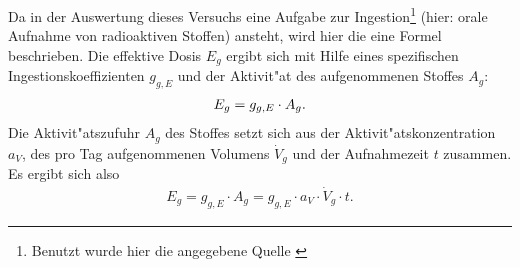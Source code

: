 \documentclass[12pt]{article}
\begin{document}
Da in der Auswertung dieses Versuchs eine Aufgabe zur Ingestion\footnote{Benutzt wurde hier die angegebene Quelle \cite{vogt-schulz}} (hier: orale Aufnahme von radioaktiven Stoffen) ansteht, wird hier die eine Formel beschrieben. Die effektive Dosis $E_g$ ergibt sich mit Hilfe eines spezifischen Ingestionskoeffizienten $g_{g,E}$ und der Aktivit"at des aufgenommenen Stoffes $A_g$:
\begin{align}
E_g=g_{g,E}\cdot A_g. \notag
\end{align}
Die Aktivit"atszufuhr $A_g$ des Stoffes setzt sich aus der Aktivit"atskonzentration $a_V$, des pro Tag aufgenommenen Volumens $\dot{V}_g$ und der Aufnahmezeit $t$ zusammen. Es ergibt sich also
\begin{align}
E_g=g_{g,E}\cdot A_g=g_{g,E}\cdot a_V\cdot \dot{V}_g \cdot t.
\label{eq:ingestion}
\end{align} 
\end{document}
